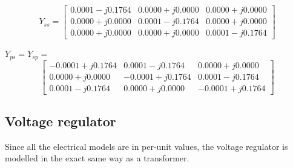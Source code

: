 \documentclass[nols,a4paper,twoside,notoc,fleqn]{tufte-book}
\begin{document}
$$
Y_{ss} =\left[ \begin{array}{ccc}
0.0001 - j0.1764 & 0.0000 + j0.0000 & 0.0000 + j0.0000\\
0.0000 + j0.0000 & 0.0001 - j0.1764 & 0.0000 + j0.0000\\
0.0000 + j0.0000 & 0.0000 + j0.0000 & 0.0001 - j0.1764
\end{array} \right]
$$



$Y_{ps} = Y_{sp} =$
$$
\left[ \begin{array}{ccc}
-0.0001 + j0.1764 & 0.0001 - j0.1764 & 0.0000 + j0.0000\\
0.0000 + j0.0000 & -0.0001 + j0.1764 & 0.0001 - j0.1764\\
0.0001 - j0.1764 & 0.0000 + j0.0000 & -0.0001 + j0.1764
\end{array} \right]
$$





\subsection{Voltage regulator}

Since all the electrical models are in per-unit values, the voltage regulator is modelled in the exact same way as a transformer.
\end{document}

